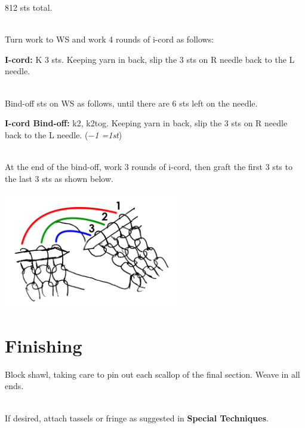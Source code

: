 \documentclass[12pt]{article}
\newcommand{\rowDir}[1]{\textbf{#1:}} %
\newcommand{\decrease}[1]{(\emph{$-$#1
	\ifnum#1=1{st}\else{sts}\fi})}
\begin{document}
812 sts total.


~\\
Turn work to WS and work 4 rounds of i-cord as follows:

\rowDir{I-cord} K 3 sts. Keeping yarn in back, slip the 3 sts on R needle back to the L needle.

~\\
Bind-off sts on WS as follows, until there are 6 sts left on the needle.

\rowDir{I-cord Bind-off} k2, k2tog. Keeping yarn in back, slip the 3 sts on R needle back to the L needle. \decrease{1}

~\\
At the end of the bind-off, work 3 rounds of i-cord, then graft the first 3 sts to the last 3 sts as shown below.

\vspace{-1em}
\begin{center}
\includegraphics[height=2in]{kitchener.png}
\end{center}

\vspace{-4em}
\section*{Finishing}

Block shawl, taking care to pin out each scallop of the final section. Weave in all ends.

~\\
If desired, attach tassels or fringe as suggested in \textbf{Special Techniques}.
\end{document}
